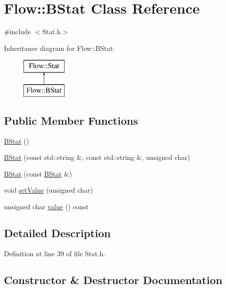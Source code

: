 \hypertarget{class_flow_1_1_b_stat}{}\section{Flow\+:\+:B\+Stat Class Reference}
\label{class_flow_1_1_b_stat}


{\ttfamily \#include $<$Stat.\+h$>$}

Inheritance diagram for Flow\+:\+:B\+Stat\+:\begin{figure}[H]
\begin{center}
\leavevmode
\includegraphics[height=2.000000cm]{class_flow_1_1_b_stat}
\end{center}
\end{figure}
\subsection*{Public Member Functions}
\begin{DoxyCompactItemize}
\item 
\hyperlink{class_flow_1_1_b_stat_ab1b39226cb1935d921c3b3c426f402eb}{B\+Stat} ()
\item 
\hyperlink{class_flow_1_1_b_stat_a757ab02769bb9990f13d9ba2e7f159a0}{B\+Stat} (const std\+::string \&, const std\+::string \&, unsigned char)
\item 
\hyperlink{class_flow_1_1_b_stat_adf5f5a63aa82025e4bd86e0df0c5dfb9}{B\+Stat} (const \hyperlink{class_flow_1_1_b_stat}{B\+Stat} \&)
\item 
void \hyperlink{class_flow_1_1_b_stat_a5613f2ccceaaa1c1b254061b398ec1f0}{set\+Value} (unsigned char)
\item 
unsigned char \hyperlink{class_flow_1_1_b_stat_a38ea6d1d87c1f5fa7951d79bae499e5e}{value} () const
\end{DoxyCompactItemize}


\subsection{Detailed Description}


Definition at line 39 of file Stat.\+h.



\subsection{Constructor \& Destructor Documentation}
\hypertarget{class_flow_1_1_b_stat_ab1b39226cb1935d921c3b3c426f402eb}{}\label{class_flow_1_1_b_stat_ab1b39226cb1935d921c3b3c426f402eb} 

